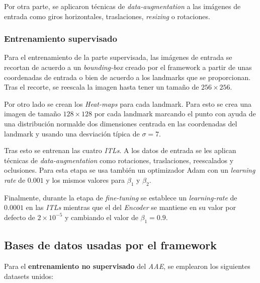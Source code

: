                 \medskip

                \noindent Por otra parte, se aplicaron técnicas de \textit{data-augmentation} a las imágenes de entrada como giros horizontales, traslaciones, \textit{resizing} o rotaciones.

            \subsubsection{Entrenamiento supervisado}
                \noindent Para el entrenamiento de la parte supervisada, las imágenes de entrada se recortan de acuerdo a un \textit{bounding-box} creado por el framework a partir de unas coordenadas de entrada o bien de acuerdo a los landmarks que se proporcionan. Tras el recorte, se reescala la imagen hasta tener un tamaño de $256\times256$. 
                
                \medskip

                \noindent Por otro lado se crean los \textit{Heat-maps} para cada landmark. Para esto se crea una imagen de tamaño $128 \times 128$ por cada landmark marcando el punto con ayuda de una distribución normalde dos dimensiones centrada en las coordenadas del landmark y usando una desviación típica de $\sigma=7$.

                \medskip

                \noindent Tras esto se entrenan las cuatro \textit{ITLs}. A los datos de entrada se les aplican técnicas de \textit{data-augmentation} como rotaciones, traslaciones, reescalados y oclusiones. Para esta etapa se usa también un optimizador Adam con un \textit{learning rate} de $0.001$ y los mismos valores para $\beta_1$ y $\beta_2$.

                \medskip

                \noindent Finalmente, durante la etapa de \textit{fine-tuning} se establece un \textit{learning-rate} de $0.0001$ en las \textit{ITLs} mientras que el del \textit{Encoder} se mantiene en su valor por defecto de $2 \times 10^{-5}$ y cambiando el valor de $\beta_1 = 0.9$.

        \subsection{Bases de datos usadas por el framework}
            
            \noindent Para el \textbf{entrenamiento no supervisado} del \textit{AAE}, se emplearon los siguientes datasets unidos: 

